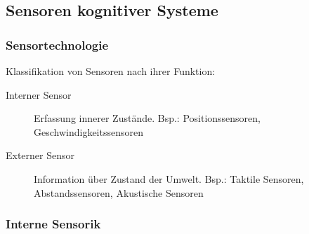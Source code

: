 \subsection{Sensoren kognitiver Systeme}

\subsubsection{Sensortechnologie}

Klassifikation von Sensoren nach ihrer Funktion:
\begin{description}
\item[Interner Sensor] Erfassung innerer Zustände. Bsp.: Positionssensoren, Geschwindigkeitssensoren
\item[Externer Sensor] Information über Zustand der Umwelt. Bsp.: Taktile Sensoren, Abstandssensoren, Akustische Sensoren
\end{description}

\subsubsection{Interne Sensorik}


